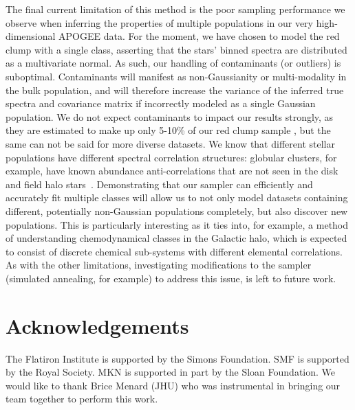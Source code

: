 \documentclass[a4paper,fleqn,usenatbib]{mnras}
\begin{document}
The final current limitation of this method is the poor sampling performance we observe when inferring the properties of multiple populations in our very high-dimensional APOGEE data. For the moment, we have chosen to model the red clump with a single class, asserting that the stars' binned spectra are distributed as a multivariate normal. As such, our handling of contaminants (or outliers) is suboptimal. Contaminants will manifest as non-Gaussianity or multi-modality in the bulk population, and will therefore increase the variance of the inferred true spectra and covariance matrix if incorrectly modeled as a single Gaussian population. We do not expect contaminants to impact our results strongly, as they are estimated to make up only 5-10\% of our red clump sample \citep{Bovy2014}, but the same can not be said for more diverse datasets. We know that different stellar populations have different spectral correlation structures: globular clusters, for example, have known abundance anti-correlations that are not seen in the disk and field halo stars~\citep[e.g.,][]{Kraft1997,Gratton2015, Pan2017,Carr2019}. Demonstrating that our sampler can efficiently and accurately fit multiple classes will allow us to not only model datasets containing different, potentially non-Gaussian populations completely, but also discover new populations. This is particularly interesting as it ties into, for example, a method of understanding chemodynamical classes in the Galactic halo, which is expected to consist of discrete chemical sub-systems with different elemental correlations. As with the other limitations, investigating modifications to the sampler (simulated annealing, for example) to address this issue, is left to future work.



\section*{Acknowledgements}

The Flatiron Institute is supported by the Simons Foundation.
SMF is supported by the Royal Society. MKN is supported in part by the Sloan Foundation. We would like to thank Brice Menard (JHU) who was instrumental in bringing our team together to perform this work. 







\bsp	%
\label{lastpage}
\end{document}
